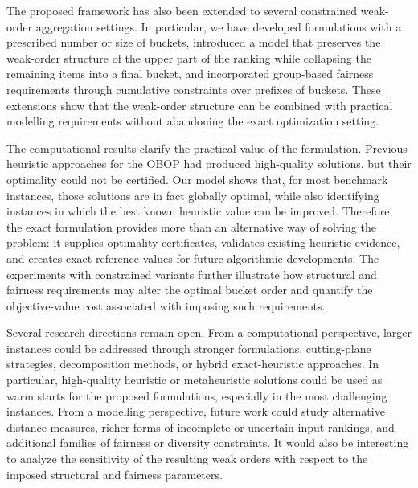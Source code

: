 \documentclass[pdflatex,basic,Numbered]{jnl}%
\theoremstyle{plain}
\theoremstyle{remark}
\theoremstyle{thmstyleone}%
\theoremstyle{thmstylethree}%
\begin{document}
The proposed framework has also been extended to several constrained weak-order aggregation settings. In particular, we have developed formulations with a prescribed number or size of buckets, introduced a model that preserves the weak-order structure of the upper part of the ranking while collapsing the remaining items into a final bucket, and incorporated group-based fairness requirements through cumulative constraints over prefixes of buckets. These extensions show that the weak-order structure can be combined with practical modelling requirements without abandoning the exact optimization setting.

The computational results clarify the practical value of the  formulation. Previous heuristic approaches for the {\rm OBOP} had produced high-quality solutions, but their optimality could not be certified. Our model shows that, for most benchmark instances, those solutions are in fact globally optimal, while also identifying instances in which the best known heuristic value can be improved. Therefore, the exact formulation provides more than an alternative way of solving the problem: it supplies optimality certificates, validates existing heuristic evidence, and creates exact reference values for future algorithmic developments. The experiments with constrained variants further illustrate how structural and fairness requirements may alter the optimal bucket order and quantify the objective-value cost associated with imposing such requirements.

Several research directions remain open. From a computational perspective, larger instances could be addressed through stronger formulations, cutting-plane strategies, decomposition methods, or hybrid exact-heuristic approaches. In particular, high-quality heuristic or metaheuristic solutions could be used as warm starts for the proposed formulations, especially in the most challenging instances. From a modelling perspective, future work could study alternative distance measures, richer forms of incomplete or uncertain input rankings, and additional families of fairness or diversity constraints. It would also be interesting to analyze the sensitivity of the resulting weak orders with respect to the imposed structural and fairness parameters.
\end{document}
